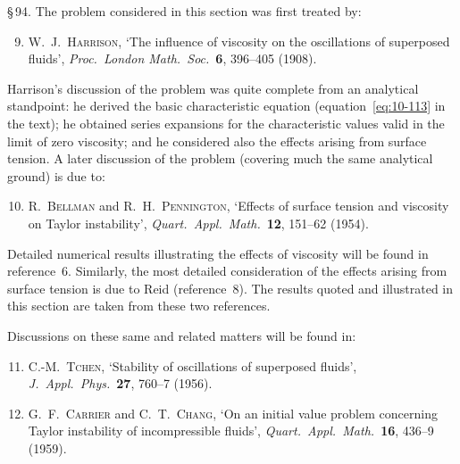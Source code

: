\medskip
\noindent\S\,94. The problem considered in this section was first treated by:

\begin{enumerate}
\setcounter{enumi}{8}
\item \textsc{W.\ J.\ Harrison}, `The influence of viscosity on the oscillations of superposed fluids', \textit{Proc.\ London Math.\ Soc.}\ \textbf{6}, 396--405 (1908).
\end{enumerate}

Harrison's discussion of the problem was quite complete from an analytical standpoint: he derived the basic characteristic equation (equation~\eqref{eq:10-113} in the text); he obtained series expansions for the characteristic values valid in the limit of zero viscosity; and he considered also the effects arising from surface tension. A later discussion of the problem (covering much the same analytical ground) is due to:

\begin{enumerate}
\setcounter{enumi}{9}
\item \textsc{R.\ Bellman} and \textsc{R.\ H.\ Pennington}, `Effects of surface tension and viscosity on Taylor instability', \textit{Quart.\ Appl.\ Math.}\ \textbf{12}, 151--62 (1954).
\end{enumerate}

Detailed numerical results illustrating the effects of viscosity will be found in reference~6. Similarly, the most detailed consideration of the effects arising from surface tension is due to Reid (reference~8). The results quoted and illustrated in this section are taken from these two references.

Discussions on these same and related matters will be found in:

\begin{enumerate}
\setcounter{enumi}{10}
\item \textsc{C.-M.\ Tchen}, `Stability of oscillations of superposed fluids', \textit{J.\ Appl.\ Phys.}\ \textbf{27}, 760--7 (1956).
\end{enumerate}

\begin{enumerate}
\setcounter{enumi}{11}
\item \textsc{G.\ F.\ Carrier} and \textsc{C.\ T.\ Chang}, `On an initial value problem concerning Taylor instability of incompressible fluids', \textit{Quart.\ Appl.\ Math.}\ \textbf{16}, 436--9 (1959).
\end{enumerate}

